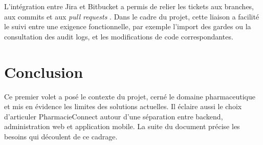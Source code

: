L'intégration entre Jira et Bitbucket a permis de relier les tickets aux branches, aux commits et aux
\emph{pull requests} \cite{atlassian_jira_bitbucket}. Dans le cadre du projet, cette liaison a facilité le suivi entre
une exigence fonctionnelle, par exemple l'import des gardes ou la consultation des audit logs, et les
modifications de code correspondantes.

\section{Conclusion}

Ce premier volet a posé le contexte du projet, cerné le domaine pharmaceutique et mis en évidence les
limites des solutions actuelles. Il éclaire aussi le choix d'articuler PharmacieConnect autour d'une
séparation entre backend, administration web et application mobile. La suite du document précise les
besoins qui découlent de ce cadrage.
